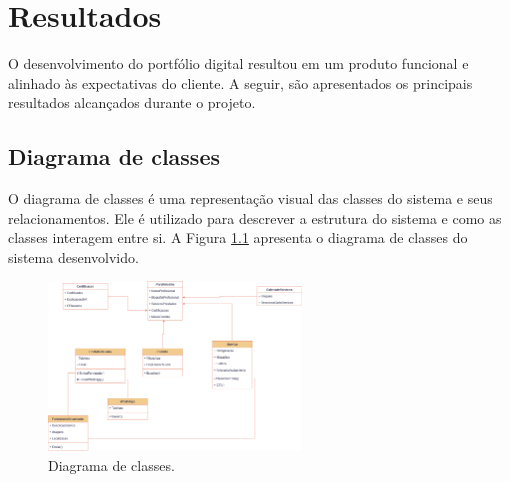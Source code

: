\chapter{Resultados}
\label{chap:result}

O desenvolvimento do portfólio digital resultou em um produto funcional e alinhado às expectativas do cliente. A seguir, são apresentados os principais resultados alcançados durante o projeto.




\section{Diagrama de classes}
\label{sec:class}
O diagrama de classes é uma representação visual das classes do sistema e seus relacionamentos. Ele é utilizado para descrever a estrutura do sistema e como as classes interagem entre si. A Figura \ref{fig:diagrama-classes} apresenta o diagrama de classes do sistema desenvolvido.

\begin{figure}[H]
    \centering
    \includegraphics[width=0.6\textwidth]{Figures/Diagrama_de_classes.png} %
    \caption{Diagrama de classes.}
    \label{fig:diagrama-classes}
\end{figure}

